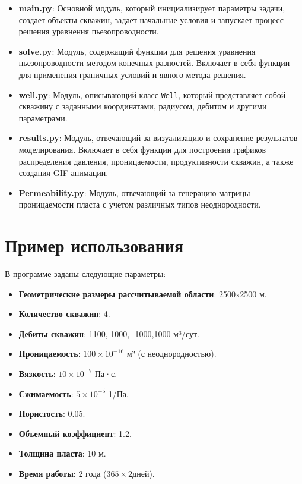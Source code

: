 \documentclass{article}
\begin{document}
\begin{itemize}
    \item \textbf{main.py}: Основной модуль, который инициализирует параметры задачи, создает объекты скважин, задает начальные условия и запускает процесс решения уравнения пьезопроводности.
    \item \textbf{solve.py}: Модуль, содержащий функции для решения уравнения пьезопроводности методом конечных разностей. Включает в себя функции для применения граничных условий и явного метода решения.
    \item \textbf{well.py}: Модуль, описывающий класс \texttt{Well}, который представляет собой скважину с заданными координатами, радиусом, дебитом и другими параметрами.
    \item \textbf{results.py}: Модуль, отвечающий за визуализацию и сохранение результатов моделирования. Включает в себя функции для построения графиков распределения давления, проницаемости, продуктивности скважин, а также создания GIF-анимации.
    \item \textbf{Permeability.py}: Модуль, отвечающий за генерацию матрицы проницаемости пласта с учетом различных типов неоднородности.
\end{itemize}

\section{Пример использования}

В программе заданы следующие параметры:

\begin{itemize}
    \item \textbf{Геометрические размеры рассчитываемой области}: 2500x2500 м.
    \item \textbf{Количество скважин}: 4.
    \item \textbf{Дебиты скважин}: 1100,-1000, -1000,1000 м³/сут.
    \item \textbf{Проницаемость}: $100 \times 10^{-16}$ м² (с неоднородностью).
    \item \textbf{Вязкость}: $10 \times 10^{-7}$ Па·с.
    \item \textbf{Сжимаемость}: $5 \times 10^{-5} $ 1/Па.
    \item \textbf{Пористость}: 0.05.
    \item \textbf{Объемный коэффициент}: 1.2.
    \item \textbf{Толщина пласта}: 10 м.
    \item \textbf{Время работы}: 2 года ($365 \times 2 дней$).
\end{itemize}
\end{document}
